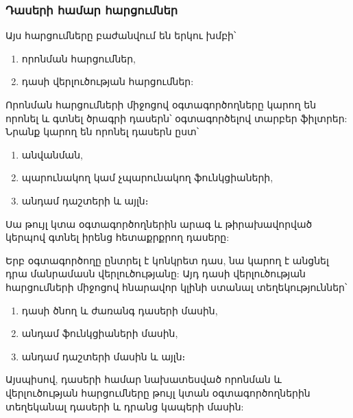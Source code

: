 \subsubsection*{Դասերի համար հարցումներ}\label{subsubsec:classes}

Այս հարցումները բաժանվում են երկու խմբի՝
\begin{enumerate}
    \item որոնման հարցումներ,
    \item դասի վերլուծության հարցումներ:
\end{enumerate}
Որոնման հարցումների միջոցով օգտագործողները կարող են որոնել և գտնել ծրագրի դասերն՝ օգտագործելով տարբեր ֆիլտրեր:
Նրանք կարող են որոնել դասերն ըստ՝
\begin{enumerate}
    \item անվանման,
    \item պարունակող կամ չպարունակող ֆունկցիաների,
    \item անդամ դաշտերի և այլն։
\end{enumerate}

Սա թույլ կտա օգտագործողներին արագ և թիրախավորված կերպով գտնել իրենց հետաքրքրող դասերը:

Երբ օգտագործողը ընտրել է կոնկրետ դաս, նա կարող է անցնել դրա մանրամասն վերլուծությանը: Այդ դասի վերլուծության
հարցումների միջոցով հնարավոր կլինի ստանալ տեղեկություններ՝
\begin{enumerate}
    \item դասի ծնող և ժառանգ դասերի մասին,
    \item անդամ ֆունկցիաների մասին,
    \item անդամ դաշտերի մասին և այլն։
\end{enumerate}

Այսպիսով, դասերի համար նախատեսված որոնման և վերլուծության հարցումները թույլ կտան օգտագործողներին տեղեկանալ դասերի
և դրանց կապերի մասին:
